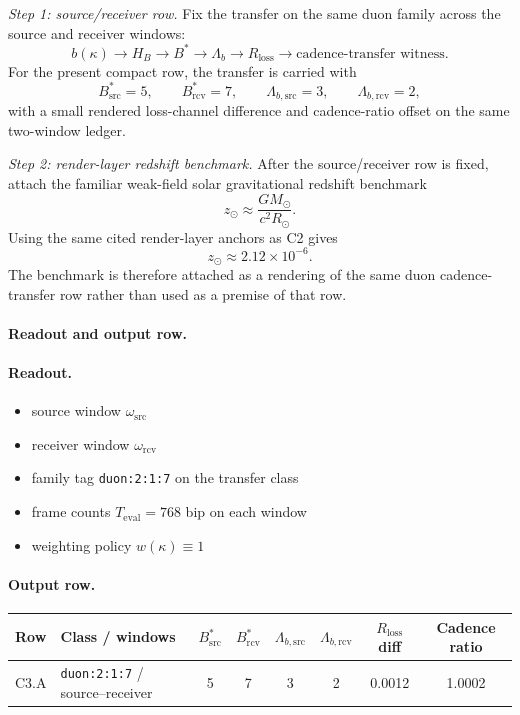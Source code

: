 \textit{Step 1: source/receiver row.} Fix the transfer on the same duon family across the source and receiver windows:
\[
b(\kappa) \longrightarrow H_B \longrightarrow B^* \longrightarrow \Lambda_b \longrightarrow R_{\mathrm{loss}} \longrightarrow \text{cadence-transfer witness}.
\]
For the present compact row, the transfer is carried with
\[
B^*_{\mathrm{src}}=5,\qquad B^*_{\mathrm{rcv}}=7,\qquad \Lambda_{b,\mathrm{src}}=3,\qquad \Lambda_{b,\mathrm{rcv}}=2,
\]
with a small rendered loss-channel difference and cadence-ratio offset on the same two-window ledger.

\textit{Step 2: render-layer redshift benchmark.} After the source/receiver row is fixed, attach the familiar weak-field solar gravitational redshift benchmark
\[
z_\odot \approx \frac{GM_\odot}{c^2 R_\odot}.
\]
Using the same cited render-layer anchors as C2 gives
\[
z_\odot \approx 2.12\times 10^{-6}.
\]
The benchmark is therefore attached as a rendering of the same duon cadence-transfer row rather than used as a premise of that row.

\paragraph{Readout and output row.}
\paragraph{Readout.}
\begin{itemize}
\item source window $\omega_{\mathrm{src}}$
\item receiver window $\omega_{\mathrm{rcv}}$
\item family tag \texttt{duon:2:1:7} on the transfer class
\item frame counts $T_{\mathrm{eval}} = 768$ bip on each window
\item weighting policy $w(\kappa)\equiv 1$
\end{itemize}

\paragraph{Output row.}
\begin{center}
\small
\begin{tabularx}{\linewidth}{@{}lXcccccc@{}}
\toprule
Row & Class / windows & $B^*_{\mathrm{src}}$ & $B^*_{\mathrm{rcv}}$ & $\Lambda_{b,\mathrm{src}}$ & $\Lambda_{b,\mathrm{rcv}}$ & $R_{\mathrm{loss}}$ diff & Cadence ratio \\
\midrule
C3.A & \texttt{duon:2:1:7} / source--receiver & 5 & 7 & 3 & 2 & 0.0012 & 1.0002 \\
\bottomrule
\end{tabularx}
\end{center}

